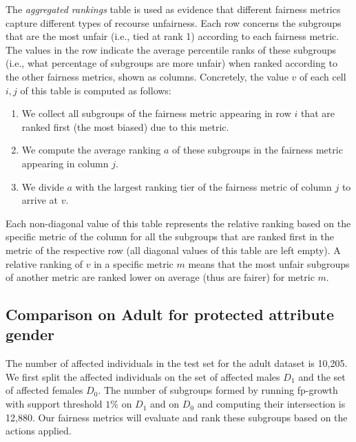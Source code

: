 \documentclass{article}
\begin{document}
The \emph{aggregated rankings} table is used as evidence that different fairness metrics capture different types of recourse unfairness. Each row concerns the subgroups that are the most unfair (i.e., tied at rank 1) according to each fairness metric. The values in the row indicate the average percentile ranks of these subgroups (i.e., what percentage of subgroups are more unfair) when ranked according to the other fairness metrics, shown as columns. Concretely, the value $v$ of each cell $i,j$ of this table is computed as follows: 
\begin{enumerate}
    \item We collect all subgroups of the fairness metric appearing in row $i$ that are ranked first (the most biased) due to this metric.
    \item We compute the average ranking $a$ of these subgroups in the fairness metric appearing in column $j$.
    \item We divide $a$ with the largest ranking tier of the fairness metric of column $j$ to arrive at $v$.
\end{enumerate}
Each non-diagonal value of this table represents the relative ranking based on the specific metric of the column for all the  subgroups that are ranked first in the metric of the respective row (all diagonal values of this table are left empty). A relative ranking of $v$ in a specific metric $m$ means that the most unfair subgroups of another metric are ranked lower on average (thus are fairer) for metric $m$.   




\subsection{Comparison on Adult for protected attribute gender}


The number of affected individuals in the test set for the adult dataset is 10,205. We first split the affected individuals on the set of affected males $D_{1}$ and the set of affected females $D_{0}$. The number of subgroups formed by running fp-growth with support threshold $1\%$ on $D_{1}$ and on $D_{0}$ and computing their intersection is 12,880.  
Our fairness metrics will evaluate and rank these subgroups based on the actions applied.
\end{document}
